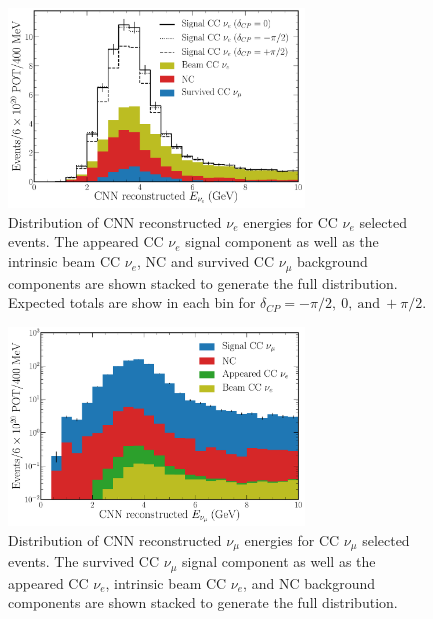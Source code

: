 \begin{figure} %
    \includegraphics[width=0.7\textwidth]{diagrams/6-cvn/chipsnet/final_nuel_passed_energy_dist.pdf}
    \caption[Distribution of CNN reconstructed $\nu_{e}$ energies for CC $\nu_{e}$ selected events.]
    {Distribution of CNN reconstructed $\nu_{e}$ energies for CC $\nu_{e}$ selected events. The
        appeared CC $\nu_{e}$ signal component as well as the intrinsic beam CC $\nu_{e}$, NC and
        survived CC $\nu_{\mu}$ background components are shown stacked to generate the full
        distribution. Expected totals are show in each bin for
        $\delta_{CP}=-\pi/2,~0,~\mathrm{and}~+\pi/2$.}
    \label{fig:final_nuel_passed_energy_dist}
\end{figure}

\begin{figure} %
    \includegraphics[width=0.7\textwidth]{diagrams/6-cvn/chipsnet/final_numu_passed_energy_dist.pdf}
    \caption[Distribution of CNN reconstructed $\nu_{\mu}$ energies for CC $\nu_{\mu}$ selected events.]
    {Distribution of CNN reconstructed $\nu_{\mu}$ energies for CC $\nu_{\mu}$ selected events.
        The survived CC $\nu_{\mu}$ signal component as well as the appeared CC $\nu_{e}$,
        intrinsic beam CC $\nu_{e}$, and NC background components are shown stacked to generate
        the full distribution.}
    \label{fig:final_numu_passed_energy_dist}
\end{figure}

